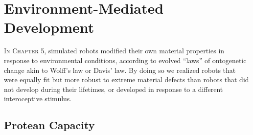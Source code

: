 



\section{Environment-Mediated Development}

\textsc{In Chapter 5,}
simulated robots modified their own material properties
in response to environmental conditions,
according to evolved ``laws'' of ontogenetic change akin to Wolff's law or Davis' law.
By doing so we realized robots that were equally fit but more robust to extreme material defects than robots that did not develop during their lifetimes, or developed in response to a different interoceptive stimulus.


\subsection{Protean Capacity}

